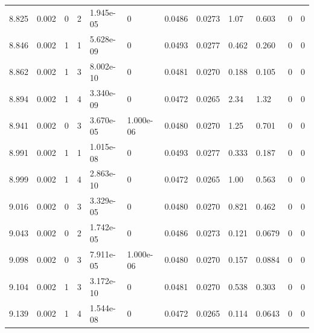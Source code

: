 \documentclass[preview]{standalone}
\begin{document}
{{{{{{\begin{tabular}{L{1.2cm}C{1.2cm} C{0.3cm}C{0.5cm} C{1.4cm}C{1.4cm} C{1.4cm}C{1.4cm} C{1.6cm}C{1.6cm} C{1.6cm}C{1.6cm}}
  8.825  &  0.002  & 0     &  2 &  1.945e-05  & 0  &  0.0486&   0.0273& 1.07 & 0.603   &  0 & 0  \\ 
  8.846  &  0.002  & 1     &  1 &  5.628e-09  & 0  &  0.0493&   0.0277& 0.462 & 0.260   &  0 & 0  \\ 
  8.862  &  0.002  & 1     &  3 &  8.002e-10  & 0  &  0.0481&   0.0270& 0.188 & 0.105   &  0 & 0  \\ 
  8.894  &  0.002  & 1     &  4 &  3.340e-09  & 0  &  0.0472&   0.0265& 2.34 & 1.32   &  0 & 0  \\ 
  8.941  &  0.002  & 0     &  3 &  3.670e-05  & 1.000e-06  &  0.0480&   0.0270& 1.25 & 0.701   &  0 & 0  \\ 
  8.991  &  0.002  & 1     &  1 &  1.015e-08  & 0  &  0.0493&   0.0277& 0.333 & 0.187   &  0 & 0  \\ 
  8.999  &  0.002  & 1     &  4 &  2.863e-10  & 0  &  0.0472&   0.0265& 1.00 & 0.563   &  0 & 0  \\ 
  9.016  &  0.002  & 0     &  3 &  3.329e-05  & 0  &  0.0480&   0.0270& 0.821 & 0.462   &  0 & 0  \\ 
  9.043  &  0.002  & 0     &  2 &  1.742e-05  & 0  &  0.0486&   0.0273& 0.121 & 0.0679   &  0 & 0  \\ 
  9.098  &  0.002  & 0     &  3 &  7.911e-05  & 1.000e-06  &  0.0480&   0.0270& 0.157 & 0.0884   &  0 & 0  \\ 
  9.104  &  0.002  & 1     &  3 &  3.172e-10  & 0  &  0.0481&   0.0270& 0.538 & 0.303   &  0 & 0  \\ 
  9.139  &  0.002  & 1     &  4 &  1.544e-08  & 0  &  0.0472&   0.0265& 0.114 & 0.0643   &  0 & 0  \\ 
\hline 
\end{tabular} 

}}}}}}
\end{document}
